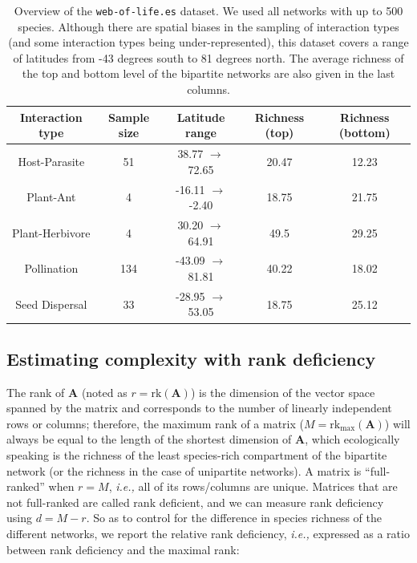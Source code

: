\begin{table}[h!]
\centering
\begin{tabular}{||c c c c c||} 
 \hline
 Interaction type & Sample size & Latitude range & Richness (top) & Richness
 (bottom) \\ [0.5ex] \hline\hline
 Host-Parasite & 51 & 38.77 \(\rightarrow\) 72.65 & 20.47 & 12.23 \\ 
 Plant-Ant & 4 & -16.11 \(\rightarrow\) -2.40 & 18.75 & 21.75 \\
 Plant-Herbivore & 4 & 30.20 \(\rightarrow\) 64.91 & 49.5 & 29.25 \\
 Pollination & 134 & -43.09 \(\rightarrow\) 81.81 & 40.22 & 18.02 \\
 Seed Dispersal & 33 & -28.95 \(\rightarrow\) 53.05 & 18.75 & 25.12 \\ [1ex] 
 \hline
\end{tabular}
\caption{Overview of the \texttt{web-of-life.es} dataset. We used all networks
with up to 500 species. Although there are spatial biases in the sampling of
interaction types (and some interaction types being under-represented), this
dataset covers a range of latitudes from -43 degrees south to 81 degrees north.
The average richness of the top and bottom level of the bipartite networks are
also given in the last columns.}
\label{table:summary}
\end{table}

\subsection{Estimating complexity with rank
deficiency}\label{estimating-complexity-with-rank-deficiency}

The rank of \(\mathbf{A}\) (noted as \(r = \text{rk}(\mathbf{A})\)) is the
dimension of the vector space spanned by the matrix and corresponds to the
number of linearly independent rows or columns; therefore, the maximum rank of a
matrix (\(M = \text{rk}_{\text{max}}(\mathbf{A})\)) will always be equal to the
length of the shortest dimension of \(\mathbf{A}\), which ecologically speaking
is the richness of the least species-rich compartment of the bipartite network
(or the richness in the case of unipartite networks). A matrix is
``full-ranked'' when \(r=M\), \emph{i.e.,} all of its rows/columns are unique.
Matrices that are not full-ranked are called rank deficient, and we can measure
rank deficiency using \(d = M-r\). So as to control for the difference in
species richness of the different networks, we report the relative rank
deficiency, \emph{i.e.,} expressed as a ratio between rank deficiency and the
maximal rank:

